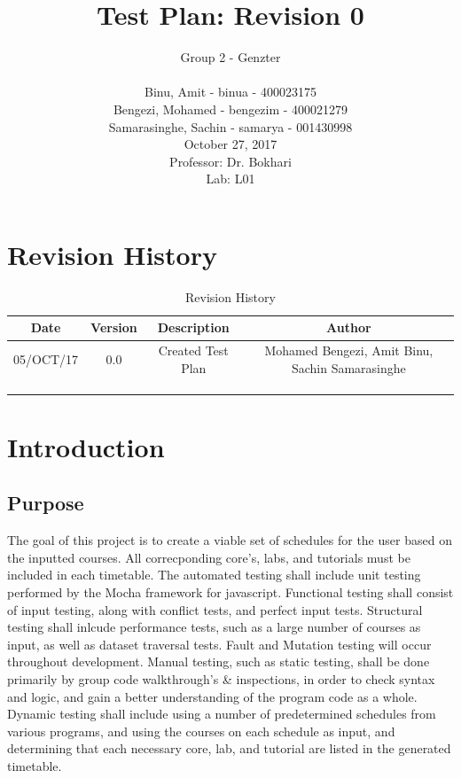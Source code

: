 \documentclass[11pt, oneside]{article}   	%
\title{Test Plan: Revision 0}
\author{Group 2 - Genzter \\
		\\ Binu, Amit - binua - 400023175
		\\ Bengezi, Mohamed - bengezim - 400021279
		\\ Samarasinghe, Sachin - samarya - 001430998
		\\ October 27, 2017
		\\Professor: Dr. Bokhari
		\\ Lab: L01}
\begin{document}
\maketitle

\newpage
\section{Revision History}

\begin{table}[h]
\begin{center}
\begin{tabular}{ | c | c | c | c | }
\hline
 Date & Version & Description & Author \\ 
\hline
 05/OCT/17 & 0.0 & Created Test Plan & Mohamed Bengezi, Amit Binu, Sachin Samarasinghe \\  
\hline
  & & & \\
\hline
 & & & \\
\hline 
 & & & \\ 
\hline 
\end{tabular}
\end{center}
\caption{Revision History}
\end{table}

\newpage
\tableofcontents
\listoffigures
\listoftables

\newpage
\section{Introduction}
\subsection{Purpose}
The goal of this project is to create a viable set of schedules for the user based on the inputted courses. All correcponding core's, labs, and tutorials must be included in each timetable. The automated testing shall include unit testing performed by the Mocha framework for javascript. Functional testing shall consist of input testing, along with conflict tests, and perfect input tests. Structural testing shall inlcude performance tests, such as a large number of courses as input, as well as dataset traversal tests. Fault and Mutation testing will occur throughout development. Manual testing, such as static testing, shall be done primarily by group code walkthrough's \& inspections, in order to check syntax and logic, and gain a better understanding of the program code as a whole. Dynamic testing shall include using a number of predetermined schedules from various programs, and using the courses on each schedule as input, and determining that each necessary core, lab, and tutorial are listed in the generated timetable. 
\end{document}
